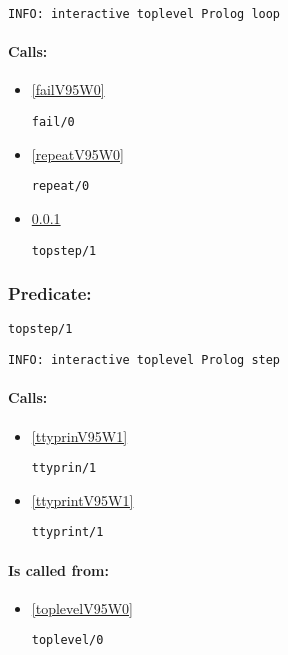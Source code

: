 {\small \begin{verbatim}
INFO: interactive toplevel Prolog loop

\end{verbatim}}
\paragraph{Calls:} 
\begin{itemize}
\item \ref{failV95W0} 
\begin{verbatim}
fail/0
\end{verbatim}

\item \ref{repeatV95W0} 
\begin{verbatim}
repeat/0
\end{verbatim}

\item \ref{topstepV95W1} 
\begin{verbatim}
topstep/1
\end{verbatim}

\end{itemize}

\subsubsection{Predicate:} \label{topstepV95W1}

\begin{verbatim}
topstep/1
\end{verbatim}

{\small \begin{verbatim}
INFO: interactive toplevel Prolog step

\end{verbatim}}
\paragraph{Calls:} 
\begin{itemize}
\item \ref{ttyprinV95W1} 
\begin{verbatim}
ttyprin/1
\end{verbatim}

\item \ref{ttyprintV95W1} 
\begin{verbatim}
ttyprint/1
\end{verbatim}

\end{itemize}
\paragraph{Is called from:} 
\begin{itemize}
\item \ref{toplevelV95W0} 
\begin{verbatim}
toplevel/0
\end{verbatim}

\end{itemize}

